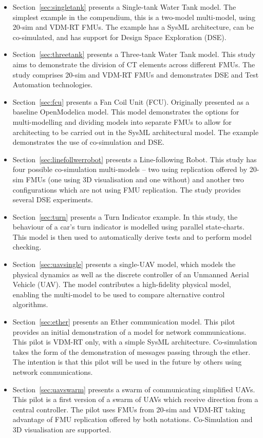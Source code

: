 \begin{itemize}
  \item Section~\ref{sec:singletank} presents a Single-tank Water Tank model. The simplest example in the compendium, this is a two-model multi-model, using 20-sim and VDM-RT FMUs.  The example has a SysML architecture, can be co-simulated, and has support for Design Space Exploration (DSE).
  \item Section~\ref{sec:threetank} presents a Three-tank Water Tank model. This study aims to demonstrate the division of CT elements across different FMUs. The study comprises 20-sim and VDM-RT FMUs and demonstrates DSE and Test Automation technologies. 
  \item Section~\ref{sec:fcu} presents a Fan Coil Unit (FCU). Originally presented as a baseline OpenModelica model. This model demonstrates the options for multi-modelling and dividing models into separate FMUs to allow for architecting to be carried out in the SysML architectural model. The example demonstrates the use of co-simulation and DSE.
  \item Section~\ref{sec:linefollwerrobot} presents a Line-following Robot. This study has four possible co-simulation multi-models -- two using replication offered by 20-sim FMUs (one using 3D visualisation and one without) and another two configurations which are not using FMU replication. The study provides several DSE experiments.
  \item Section~\ref{sec:turn} presents a Turn Indicator example.
  In this study, the behaviour of a car's turn indicator is modelled using parallel state-charts.
  This model is then used to automatically derive tests and to perform model checking.
  \item Section~\ref{sec:uavsingle} presents a single-UAV model, which models the physical dynamics as well as the discrete controller of an Unmanned Aerial Vehicle (UAV). The model contributes a high-fidelity physical model, enabling the multi-model to be used to compare alternative control algorithms.
  \item Section~\ref{sec:ether} presents an Ether communication model. This pilot provides an initial demonstration of a model for network communications. This pilot is VDM-RT only, with a simple SysML architecture. Co-simulation takes the form of the demonstration of messages passing through the ether. The intention is that this pilot will be used in the future by others using network communications. 
  \item Section~\ref{sec:uavswarm} presents a swarm of communicating simplified UAVs. This pilot is a first version of a swarm of UAVs which receive direction from a central controller. The pilot uses FMUs from 20-sim and VDM-RT taking advantage of FMU replication offered by both notations. Co-Simulation and 3D visualisation are supported.

\end{itemize}
